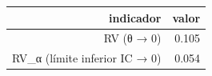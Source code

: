 \begin{tabular}{rr}
\toprule
indicador & valor \\
\midrule
RV (θ → 0) & 0.105 \\
RV\_α (límite inferior IC → 0) & 0.054 \\
\bottomrule
\end{tabular}